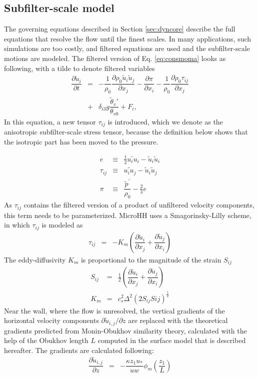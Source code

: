 \documentclass[gmd]{copernicus}
\newcommand{\uf}{\ensuremath{\widetilde{u}}}
\newcommand{\thetaf}{\ensuremath{\widetilde{\theta}}}
\begin{document}
\subsection{Subfilter-scale model}
The governing equations described in Section \ref{sec:dyncore} describe the full equations that resolve the flow until the finest scales. In many applications, such simulations are too costly, and filtered equations are used and the subfilter-scale motions are modeled. The filtered version of Eq. \ref{eq:consmoma} looks as following, with a tilde to denote filtered variables
\begin{eqnarray}
\nonumber \dfrac{\partial \uf_i}{\partial t} & = & - \dfrac{1}{\rho_0} \dfrac{\partial \rho_0 \uf_i \uf_j}{\partial x_j} 
- \dfrac{\partial \pi}{\partial x_i} - \dfrac{1}{\rho_0} \dfrac{\partial \rho_0 \tau_{ij}}{\partial x_j}\\
& + & \delta_{i3} g \dfrac{\thetaf_v'}{\theta_{v0}} + F_i,\label{eq:consmoma_filter}
\end{eqnarray}
In this equation, a new tensor $\tau_{ij}$ is introduced, which we denote as the anisotropic subfilter-scale stress tensor, because the definition below shows that the isotropic part has been moved to the pressure.

\begin{eqnarray}
e          & \equiv & \frac{1}{2} \widetilde{u_i u_i} - \uf_i \uf_i\\
\tau_{ij}  & \equiv & \widetilde{u_i u_j} - \uf_i \uf_j\\
\pi        & \equiv & \dfrac{\widetilde{p}^\prime}{\rho_0} - \frac{2}{3} e
\end{eqnarray}
As $\tau_{ij}$ contains the filtered version of a product of unfiltered velocity components, this term needs to be parameterized. MicroHH uses a Smagorinsky-Lilly \citep{Lilly1968} scheme, in which $\tau_{ij}$ is modeled as
\begin{eqnarray}
\tau_{ij} & = & -K_m \left( \dfrac{\partial \uf_i}{\partial x_j} + \dfrac{\partial \uf_j}{\partial x_i} \right)
\end{eqnarray}
The eddy-diffusivity $K_m$ is proportional to the magnitude of the strain $S_{ij}$
\begin{eqnarray}
S_{ij} & = & \frac{1}{2} \left( \dfrac{\partial \uf_i}{\partial x_j} + \dfrac{\partial \uf_j}{\partial x_i} \right)\\
K_m    & = & c_s^2 \Delta^2 \left( 2 S_{ij} S{ij} \right)^\frac{1}{2}
\end{eqnarray}
Near the wall, where the flow is unresolved, the vertical gradients of the horizontal velocity components $\partial \uf_{i,j}/\partial z$ are replaced with the theoretical gradients predicted from Monin-Obukhov similarity theory, calculated with the help of the Obukhov length $L$ computed in the surface model that is described hereafter. The gradients are calculated following:
\begin{eqnarray}
\dfrac{\partial \uf_{i,j}}{\partial z} & = & -\dfrac{\kappa z_1 u_*}{uw} \phi_m \left( \dfrac{z_1}{L} \right)
\end{eqnarray}
\end{document}
